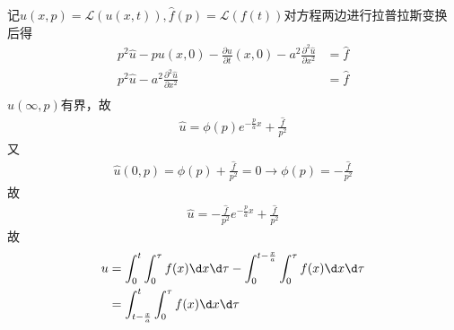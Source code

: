 \documentclass{phyasgn}
\renewcommand{\L}{\mathcal{L}}
\begin{document}
\begin{sol}[4]
记$\hat{u}(x,p)=\L(u(x,t)),\hat{f}(p)=\L(f(t))$对方程两边进行拉普拉斯变换后得
\begin{align*}
    p^2\hat{u}-pu(x,0)-\frac{\partial u}{\partial t}(x,0)-a^2\frac{\partial^2\hat{u}}{\partial x^2}&=\hat{f}\\
    p^2\hat{u}-a^2\frac{\partial^2\hat{u}}{\partial x^2}&=\hat{f}\\
\end{align*}
$u(\infty,p)$有界，故
\begin{align*}
    \hat{u}=\phi(p)e^{-\frac{p}{a}x}+\frac{\hat{f}}{p^2}
\end{align*}
又
\begin{align*}
    \hat{u}(0,p)=\phi(p)+\frac{\hat{f}}{p^2}=0\to \phi(p)=-\frac{\hat{f}}{p^2}
\end{align*}
故
\begin{align*}
    \hat{u}=-\frac{\hat{f}}{p^2}e^{-\frac{p}{a}x}+\frac{\hat{f}}{p^2}
\end{align*}
故
\begin{align*}
    u&=\int_0^t\int_{0}^{\tau}f(x)\d x\d \tau-\int_{0}^{t-\frac{x}{a}}\int_{0}^{\tau}f(x)\d x\d\tau\\
    &=\int_{t-\frac{x}{a}}^t\int_{0}^{\tau}f(x)\d x\d \tau
\end{align*}
\end{sol}\par
\end{document}
